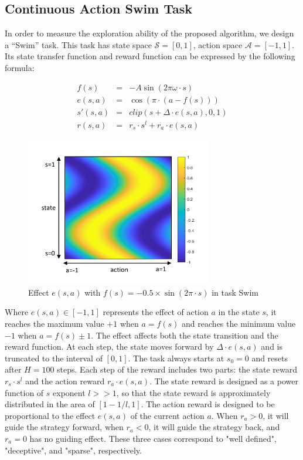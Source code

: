 \subsection{Continuous Action Swim Task}
In order to measure the exploration ability of the proposed algorithm, we design a ``Swim'' task. This task has state space $ \mathcal{S} = [0,1]$, action space $ \mathcal{A} = [-1,1] $. Its state transfer function and reward function can be expressed by the following formula:

\begin{eqnarray}
    f(s) &=& -A \sin(2\pi \omega \cdot s) \\
    e(s,a) &=& \cos(\pi\cdot (a-f(s)))\\
    s'(s,a) &=& clip(s + \Delta \cdot e(s,a),0,1)\\
    r(s,a) &=& r_s\cdot s^l + r_a \cdot e(s,a)
\end{eqnarray}

\begin{figure}[!htb]
\centering
\includegraphics[width=230pt]{figs/Swim.pdf}
\caption{Effect $e(s,a)$ with $f(s) = -0.5\times \sin(2\pi\cdot s)$ in task Swim }
\label{fig:swim}
\end{figure}

Where $e(s,a)\in [-1,1] $ represents the effect of action $a$ in the state $s$, it reaches the maximum value $+1$ when $a=f(s)$ and reaches the minimum value $-1$ when $a= f(s)\pm 1 $. The effect affects both the state transition and the reward function. At each step, the state moves forward by $ \Delta \cdot e(s,a) $ and is truncated to the interval of $ [0,1] $. The task always starts at $ s_0 = 0 $ and resets after $ H = 100 $ steps. Each step of the reward includes two parts: the state reward $ r_s \cdot s ^ l $ and the action reward $ r_a \cdot e (s, a) $. The state reward is designed as a power function of $ s $ exponent $ l >> 1 $, so that the state reward is approximately distributed in the area of $ [1-1/l, 1] $. The action reward is designed to be proportional to the effect $ e(s, a) $ of the current action $ a $. When $ r_a> 0 $, it will guide the strategy forward, when $ r_a <0 $, it will guide the strategy back, and $ r_a = 0 $ has no guiding effect. These three cases correspond to "well defined", "deceptive", and "sparse", respectively.

